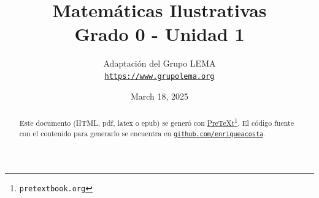 
\title{Matemáticas Ilustrativas\\
{\large Grado 0 - Unidad 1}}
\author{Adaptación del Grupo LEMA\\
\href{https://www.grupolema.org}{\nolinkurl{https://www.grupolema.org}}
}
\date{March 18, 2025}

\raggedbottom
\label{gra0-uni1}\hypertarget{gra0-uni1}{}
\maketitle
\thispagestyle{empty}
\renewcommand*{\abstractname}{}
\begin{abstract}
Este documento (HTML, pdf, latex o epub) se generó con \href{https://pretextbook.org}{PreTeXt}\footnote{\nolinkurl{pretextbook.org}\label{meta-source-2-2}}. El código fuente con el contenido para generarlo se encuentra en \href{https://github.com/enriqueacosta/IllustrativeMath-GrupoLEMA}{\nolinkurl{github.com/enriqueacosta}}.%
\end{abstract}
\clearpage
\renewcommand*{\abstractname}{Resumen}
